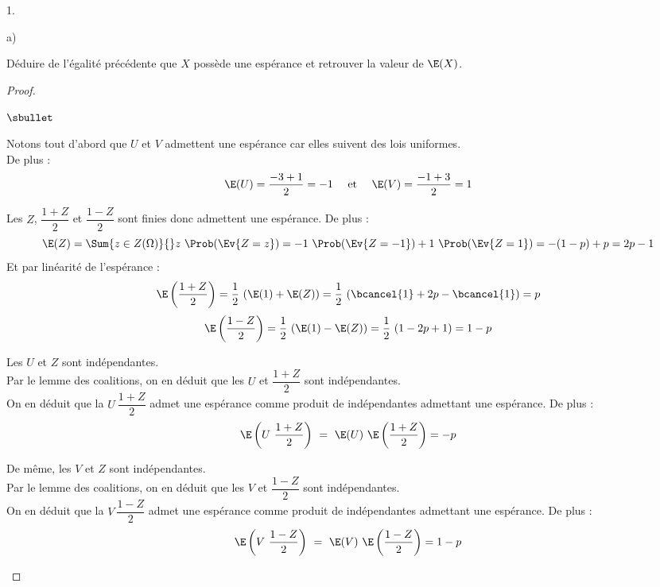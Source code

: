 \documentclass[11pt]{article}%
\begin{document}
\begin{noliste}{1.}
\begin{noliste}{a)}
    \newpage


  \item Déduire de l'égalité précédente que $X$ possède une espérance
    et retrouver la valeur de $\E(X)$.

    \begin{proof}~
      \begin{noliste}{$\sbullet$}
      \item Notons tout d'abord que $U$ et $V$ admettent une espérance
        car elles suivent des lois uniformes. \\
        De plus :
        \[
        \E(U) = \dfrac{-3 + 1}{2} = -1 \quad \text{ et } \quad \E(V) =
        \dfrac{-1 + 3}{2} = 1
        \]
      \item Les \var $Z$, $\dfrac{1+Z}{2}$ et $\dfrac{1-Z}{2}$ sont
        finies donc admettent une espérance. De plus :
        \[
        \E(Z) = \Sum{z \in Z(\Omega)}{} z \ \Prob(\Ev{Z = z}) = -1 \
        \Prob(\Ev{Z = -1}) + 1 \ \Prob(\Ev{Z = 1}) = -(1-p) + p = 2p-1
        \]
        Et par linéarité de l'espérance :
        \[
        \E\left(\dfrac{1+Z}{2}\right) = \dfrac{1}{2} \ (\E(1) + \E(Z)) =
        \dfrac{1}{2} \ (\bcancel{1} + 2p -\bcancel{1}) = p
        \]
        \[
        \E\left(\dfrac{1-Z}{2}\right) = \dfrac{1}{2} \ (\E(1) - \E(Z)) =
        \dfrac{1}{2} \ (1 - 2p + 1) = 1-p
        \]

      \item Les \var $U$ et $Z$ sont indépendantes.\\
        Par le lemme des coalitions, on en déduit que les \var $U$ et
        $\dfrac{1+Z}{2}$ sont indépendantes.\\
        On en déduit que la \var $U \ \dfrac{1+Z}{2}$ admet une
        espérance comme produit de \var indépendantes admettant une
        espérance. De plus : 
        \[
        \E\left(U \ \dfrac{1+Z}{2}\right) \ = \ \E(U) \
        \E\left(\dfrac{1+Z}{2}\right) = - p
        \]

      \item De même, les \var $V$ et $Z$ sont indépendantes.\\
        Par le lemme des coalitions, on en déduit que les \var $V$ et
        $\dfrac{1-Z}{2}$ sont indépendantes.\\
        On en déduit que la \var $V \ \dfrac{1-Z}{2}$ admet une
        espérance comme produit de \var indépendantes admettant une
        espérance. De plus : 
        \[
        \E\left(V \ \dfrac{1-Z}{2}\right) \ = \ \E(V) \
        \E\left(\dfrac{1-Z}{2}\right) = 1-p
        \]


\end{noliste}
\end{proof}
\end{noliste}
\end{noliste}
\end{document}
